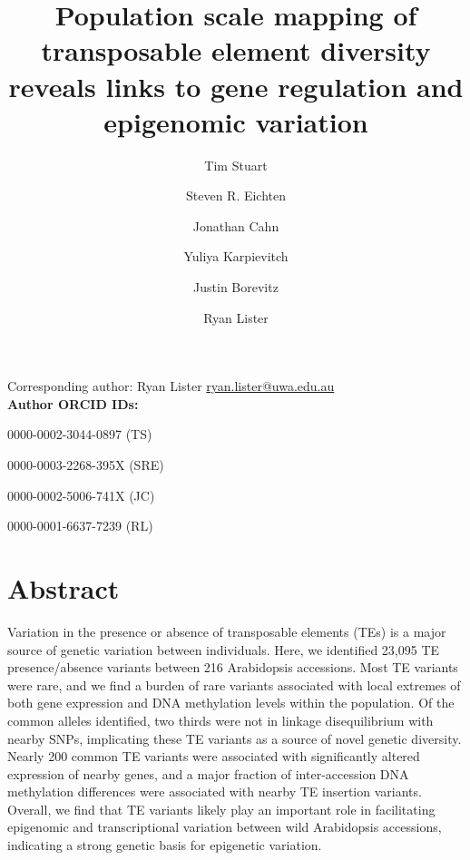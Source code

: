 \documentclass[12pt]{article}
\date{}
\begin{document}
\title{Population scale mapping of transposable element diversity reveals links to gene regulation and epigenomic variation}

\author[1]{Tim Stuart}
\author[2]{Steven R. Eichten}
\author[1]{Jonathan Cahn}
\author[1]{Yuliya Karpievitch}
\author[2]{Justin Borevitz}
\author[1]{Ryan Lister}

\renewcommand\Authands{ and }

\maketitle

Corresponding author: Ryan Lister \href{mailto:ryan.lister@uwa.edu.au}{ryan.lister@uwa.edu.au} \\

\textbf{Author ORCID IDs:}

0000-0002-3044-0897 (TS)

0000-0003-2268-395X (SRE)

0000-0002-5006-741X (JC)

0000-0001-6637-7239 (RL)


\linenumbers

\section{Abstract}

Variation in the presence or absence of transposable elements (TEs) is
a major source of genetic variation between individuals. Here, we
identified 23,095 TE presence/absence variants between 216 Arabidopsis
accessions. Most TE variants were rare, and we find a burden of rare
variants associated with local extremes of both gene expression and
DNA methylation levels within the population. Of the common alleles
identified, two thirds were not in linkage disequilibrium with nearby
SNPs, implicating these TE variants as a source of novel genetic
diversity. Nearly 200 common TE variants were associated with
significantly altered expression of nearby genes, and a major fraction
of inter-accession DNA methylation differences were associated with
nearby TE insertion variants. Overall, we find that TE variants likely
play an important role in facilitating epigenomic and transcriptional
variation between wild Arabidopsis accessions, indicating a strong
genetic basis for epigenetic variation.
\end{document}
